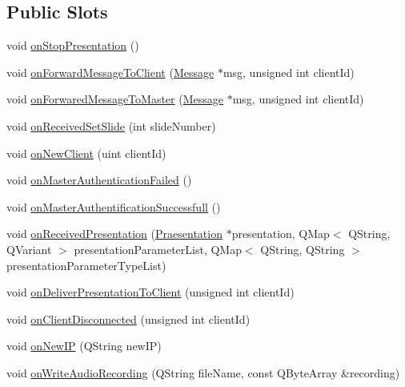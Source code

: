 \subsection*{Public Slots}
\begin{DoxyCompactItemize}
\item 
void \hyperlink{class_server_appl_1_1_server_a58bf3574ddee832a114aaa7652372bae}{on\+Stop\+Presentation} ()
\item 
void \hyperlink{class_server_appl_1_1_server_a7216e8161ab1907b5d899718f8757c05}{on\+Forward\+Message\+To\+Client} (\hyperlink{class_message}{Message} $\ast$msg, unsigned int client\+Id)
\item 
void \hyperlink{class_server_appl_1_1_server_a688f9c5d409ed90572a69aa7f54240bf}{on\+Forwared\+Message\+To\+Master} (\hyperlink{class_message}{Message} $\ast$msg, unsigned int client\+Id)
\item 
void \hyperlink{class_server_appl_1_1_server_a66ffe6e0ecf4aaf3cb83215d7e14fd6c}{on\+Received\+Set\+Slide} (int slide\+Number)
\item 
void \hyperlink{class_server_appl_1_1_server_aec2c1436c6a6cbb8ef4400d7c986cd80}{on\+New\+Client} (uint client\+Id)
\item 
void \hyperlink{class_server_appl_1_1_server_aa92b4c070111a2efe7a99b95708e545f}{on\+Master\+Authentication\+Failed} ()
\item 
void \hyperlink{class_server_appl_1_1_server_a83286ec5660a7fe0a1fe3764e1eba91a}{on\+Master\+Authentification\+Successfull} ()
\item 
void \hyperlink{class_server_appl_1_1_server_a694f60e54fc0dd24cd5b7b41731a060d}{on\+Received\+Presentation} (\hyperlink{class_praesentation}{Praesentation} $\ast$presentation, Q\+Map$<$ Q\+String, Q\+Variant $>$ presentation\+Parameter\+List, Q\+Map$<$ Q\+String, Q\+String $>$ presentation\+Parameter\+Type\+List)
\item 
void \hyperlink{class_server_appl_1_1_server_a5bb9d08bbbd005132ba892033ef1fd2a}{on\+Deliver\+Presentation\+To\+Client} (unsigned int client\+Id)
\item 
void \hyperlink{class_server_appl_1_1_server_a29e8649cb4010e5b0620a03cc9f38ac8}{on\+Client\+Disconnected} (unsigned int client\+Id)
\item 
void \hyperlink{class_server_appl_1_1_server_a8aaec8df3cb6d1fbd949dd75b36f66b2}{on\+New\+I\+P} (Q\+String new\+I\+P)
\item 
void \hyperlink{class_server_appl_1_1_server_a5fc71b2de6794aac74789087115bbaf4}{on\+Write\+Audio\+Recording} (Q\+String file\+Name, const Q\+Byte\+Array \&recording)
\end{DoxyCompactItemize}
